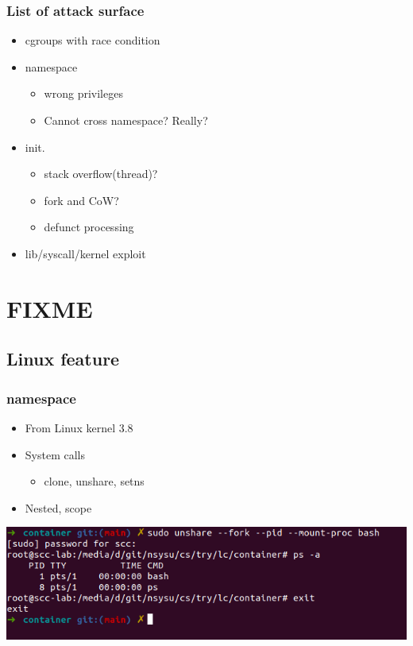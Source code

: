 \documentclass{beamer}
\begin{document}
\begin{frame}
    \frametitle{List of attack surface}
    \begin{itemize}
        \item cgroups with race condition
        \item namespace
              \begin{itemize}
                  \item wrong privileges
                  \item Cannot cross namespace? Really?
              \end{itemize}
        \item init.
              \begin{itemize}
                  \item stack overflow(thread)?
                  \item fork and CoW?
                  \item defunct processing
              \end{itemize}
        \item lib/syscall/kernel exploit
    \end{itemize}
\end{frame}


\section{FIXME}
\subsection{Linux feature}
\begin{frame}
    \frametitle{namespace}
    \begin{itemize}
        \item From Linux kernel 3.8
        \item System calls
              \begin{itemize}
                  \item clone, unshare, setns
              \end{itemize}
        \item Nested, scope
    \end{itemize}
    \includegraphics[width=\textwidth]{unshare_cmd.png}
\end{frame}
\end{document}
